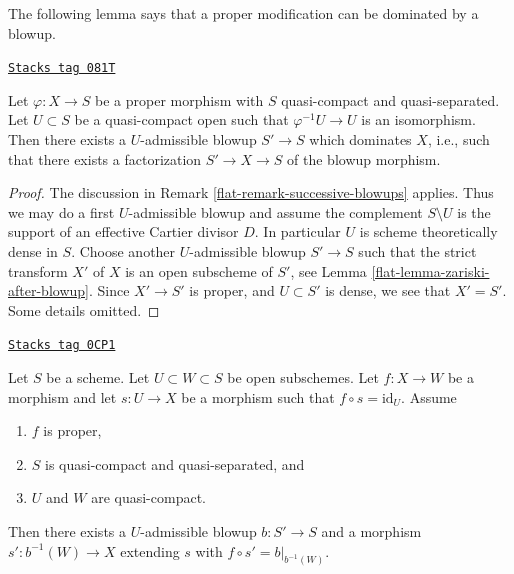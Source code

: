 The following lemma says that a proper modification can be dominated
by a blowup.

\begin{lemma}
\label{flat-lemma-dominate-modification-by-blowup}
\href{https://stacks.math.columbia.edu/tag/081T}{\texttt{Stacks tag 081T}}

Let $\varphi : X \to S$ be a proper morphism with
$S$ quasi-compact and quasi-separated. Let $U \subset S$ be a
quasi-compact open such that $\varphi^{-1}U \to U$ is an isomorphism.
Then there exists a $U$-admissible blowup $S' \to S$
which dominates $X$, i.e., such that there exists a factorization
$S' \to X \to S$ of the blowup morphism.
\end{lemma}

\begin{proof}

The discussion in Remark \ref{flat-remark-successive-blowups} applies.
Thus we may do a first $U$-admissible blowup and assume the complement
$S \setminus U$ is the support of an effective Cartier divisor $D$.
In particular $U$ is scheme theoretically dense in $S$.
Choose another $U$-admissible blowup $S' \to S$ such that the strict
transform $X'$ of $X$ is an open subscheme of $S'$, see
Lemma \ref{flat-lemma-zariski-after-blowup}.
Since $X' \to S'$ is proper, and
$U \subset S'$ is dense, we see that $X' = S'$. Some details omitted.
\end{proof}

\begin{lemma}
\label{flat-lemma-get-section-after-blowup}
\href{https://stacks.math.columbia.edu/tag/0CP1}{\texttt{Stacks tag 0CP1}}

Let $S$ be a scheme. Let $U \subset W \subset S$ be open subschemes.
Let $f : X \to W$ be a morphism and let $s : U \to X$ be a
morphism such that $f \circ s = \text{id}_U$. Assume
\begin{enumerate}
\item $f$ is proper,
\item $S$ is quasi-compact and quasi-separated, and
\item $U$ and $W$ are quasi-compact.
\end{enumerate}
Then there exists a $U$-admissible blowup $b : S' \to S$ and a morphism
$s' : b^{-1}(W) \to X$ extending $s$ with $f \circ s' = b|_{b^{-1}(W)}$.
\end{lemma}

